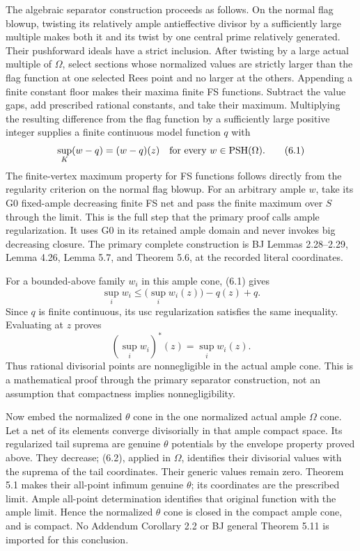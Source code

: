 \documentclass[
  10pt,
]{article}
\begin{document}
The algebraic separator construction proceeds as follows. On the normal
flag blowup, twisting its relatively ample antieffective divisor by a
sufficiently large multiple makes both it and its twist by one central
prime relatively generated. Their pushforward ideals have a strict
inclusion. After twisting by a large actual multiple of \(\Omega\),
select sections whose normalized values are strictly larger than the
flag function at one selected Rees point and no larger at the others.
Appending a finite constant floor makes their maxima finite FS
functions. Subtract the value gaps, add prescribed rational constants,
and take their maximum. Multiplying the resulting difference from the
flag function by a sufficiently large positive integer supplies a finite
continuous model function \(q\) with
\[\sup_K(w-q)=(w-q)(z)\quad\hbox{for every }w\in\operatorname{PSH}(\Omega).\tag{6.1}\]
The finite-vertex maximum property for FS functions follows directly
from the regularity criterion on the normal flag blowup. For an
arbitrary ample \(w\), take its G0 fixed-ample decreasing finite FS net
and pass the finite maximum over \(S\) through the limit. This is the
full step that the primary proof calls ample regularization. It uses G0
in its retained ample domain and never invokes big decreasing closure.
The primary complete construction is BJ Lemmas 2.28--2.29, Lemma 4.26,
Lemma 5.7, and Theorem 5.6, at the recorded literal coordinates.

For a bounded-above family \(w_i\) in this ample cone, (6.1) gives
\[\sup_i w_i\leq\bigl(\sup_i w_i(z)\bigr)-q(z)+q.\] Since \(q\) is
finite continuous, its usc regularization satisfies the same inequality.
Evaluating at \(z\) proves
\[\left(\sup_i w_i\right)^*(z)=\sup_i w_i(z).\tag{6.2}\] Thus rational
divisorial points are nonnegligible in the actual ample cone. This is a
mathematical proof through the primary separator construction, not an
assumption that compactness implies nonnegligibility.

Now embed the normalized \(\theta\) cone in the one normalized actual
ample \(\Omega\) cone. Let a net of its elements converge divisorially
in that ample compact space. Its regularized tail suprema are genuine
\(\theta\) potentials by the envelope property proved above. They
decrease; (6.2), applied in \(\Omega\), identifies their divisorial
values with the suprema of the tail coordinates. Their generic values
remain zero. Theorem 5.1 makes their all-point infimum genuine
\(\theta\); its coordinates are the prescribed limit. Ample all-point
determination identifies that original function with the ample limit.
Hence the normalized \(\theta\) cone is closed in the compact ample
cone, and is compact. No Addendum Corollary 2.2 or BJ general Theorem
5.11 is imported for this conclusion.
\end{document}
